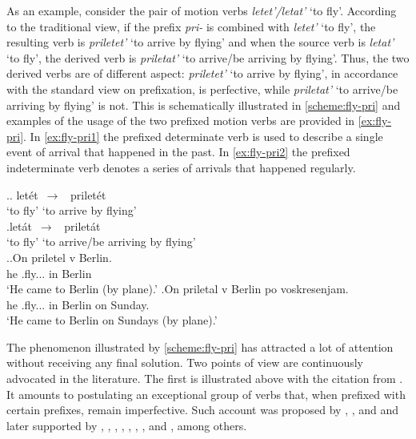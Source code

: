 
As an example, consider the pair of motion verbs \textit{letet'/letat'} `to fly'. According to the traditional view, if the prefix \textit{pri-} is combined with \textit{letet'}\textsubscript{\DET} `to fly', the resulting verb is \textit{priletet'}\textsuperscript{\PF} `to arrive by flying' and when the source verb is \textit{letat'}\textsubscript{\INDET} `to fly', the derived verb is \textit{priletat'}\textsuperscript{\IPF} `to arrive/be arriving by flying'. Thus, the two derived verbs are of different aspect: \textit{priletet'} `to arrive by flying', in accordance with the standard view on prefixation, is perfective, while \textit{priletat'} `to arrive/be arriving by flying' is not. This is schematically illustrated in \ref{scheme:fly-pri} and examples of the usage of the two prefixed motion verbs are provided in \ref{ex:fly-pri}. In \ref{ex:fly-pri1} the prefixed determinate verb is used to describe a single event of arrival that happened in the past. In \ref{ex:fly-pri2} the prefixed indeterminate verb denotes a series of arrivals that happened regularly.

\ex.\label{scheme:fly-pri}\ag. let\'{e}t\textsuperscript{\IPF}~$\to$~ prilet\'{e}t\textsuperscript{\PF}\\
{`to fly'} {`to arrive by flying'}\\
\bg.let\'{a}t\textsuperscript{\IPF}~$\to$~ prilet\'{a}t\textsuperscript{\IPF}\\
{`to fly'} {`to arrive/be arriving by flying'}\\

\ex.\label{ex:fly-pri}\ag.\label{ex:fly-pri1}On priletel\textsuperscript{\PF} v Berlin.\\
he .fly... in Berlin\\
\trans `He came to Berlin (by plane).'
\bg.\label{ex:fly-pri2}On priletal\textsuperscript{\IPF} v Berlin po voskresenjam.\\
he .fly... in Berlin on Sunday.\\
\trans `He came to Berlin on Sundays (by plane).'

The phenomenon illustrated by \ref{scheme:fly-pri} has attracted a lot of attention without receiving any final solution. Two points of view are continuously advocated in the literature. The first is illustrated above with the citation from \citet{Titelbaum:90}. It amounts to postulating an exceptional group of verbs that, when prefixed with certain prefixes, remain imperfective. Such account was proposed by \citet[46]{Meillet:1902}, \citet[5]{Mazon:1908}, and \citet{Vondrak:1908} and later supported by \citet{Shaxmatov:41}, \citet{Gvozdev:73}, \citet{Vinogradov:72}, \citet{Townsend:75}, \citet{Shvedova:82}, \citet{Wade:92}, \citet{Nesset:08}, and \citet{Janda:10}, among others. 

